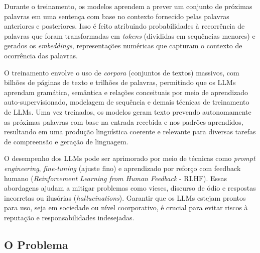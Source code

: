 \documentclass[a4paper, 12pt]{article}
\newcommand{\citeb}[1]{\bibleftbracket\cite{#1}\bibrightbracket}
\begin{document}

    Durante o treinamento, os modelos aprendem a prever um conjunto de próximas palavras em uma sentença com base no contexto fornecido pelas palavras anteriores e posteriores. Isso é feito atribuindo probabilidades à recorrência de palavras que foram transformadas em \textit{tokens} (divididas em sequências menores) e gerados os \textit{embeddings}, representações numéricas que capturam o contexto de ocorrência das palavras.

    O treinamento envolve o uso de \textit{corpora} (conjuntos de textos) massivos, com bilhões de páginas de texto e trilhões de palavras, permitindo que os LLMs aprendam gramática, semântica e relações conceituais por meio de aprendizado auto-supervisionado, modelagem de sequência e demais técnicas de treinamento de LLMs. Uma vez treinados, os modelos geram texto prevendo autonomamente as próximas palavras com base na entrada recebida e nos padrões aprendidos, resultando em uma produção linguística coerente e relevante para diversas tarefas de compreensão e geração de linguagem.

    O desempenho dos LLMs pode ser aprimorado por meio de técnicas como \textit{prompt engineering}, \textit{fine-tuning} (ajuste fino) e aprendizado por reforço com feedback humano (\textit{Reinforcement Learning from Human Feedback} - RLHF). Essas abordagens ajudam a mitigar problemas como vieses, discurso de ódio e respostas incorretas ou ilusórias (\textit{hallucinations}). Garantir que os LLMs estejam prontos para uso, seja em sociedade ou nível coorporativo, é crucial para evitar riscos à reputação e responsabilidades indesejadas.


    \subsection{O Problema}

\end{document}
